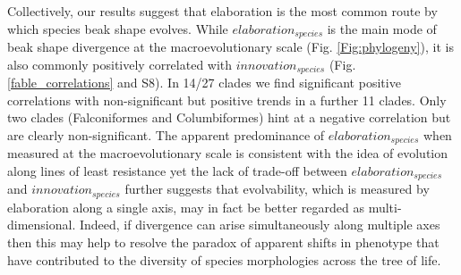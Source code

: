 \documentclass[12pt,letterpaper]{article}
\begin{document}
Collectively, our results suggest that elaboration is the most common route by which species beak shape evolves.
While $elaboration_{species}$ is the main mode of beak shape divergence at the macroevolutionary scale %
(Fig. \ref{Fig:phylogeny}), it is also commonly positively correlated with $innovation_{species}$ (Fig. \ref{fable_correlations} and S8). %
In 14/27 clades we find significant positive correlations with non-significant but positive trends in a further 11 clades.
Only two clades (Falconiformes and Columbiformes) hint at a negative correlation but are clearly non-significant.
The apparent predominance of $elaboration_{species}$ when measured at the macroevolutionary scale is consistent with the idea of evolution along lines of least resistance %
yet the lack of trade-off between $elaboration_{species}$ and $innovation_{species}$ further suggests that evolvability, which is measured by elaboration along a single axis, may in fact be better regarded as multi-dimensional.
Indeed, if divergence can arise simultaneously along multiple axes then this may help to resolve the paradox of apparent shifts in phenotype that have contributed to the diversity of species morphologies across the tree of life.
\end{document}
